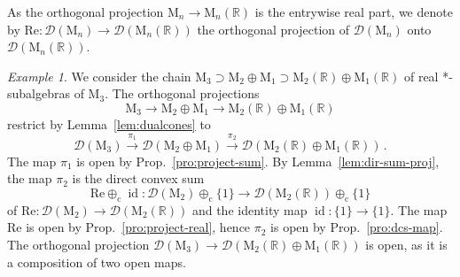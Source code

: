 \documentclass[a4paper,11pt,reqno]{amsart}
\newcommand{\R}{\mathbb{R}}
\newcommand{\M}{\mathrm{M}}
\newcommand{\cD}{\mathcal{D}}
\renewcommand\Re{\mathrm{Re}}
\newcommand{\dcs}{\oplus_\mathrm{c}}
\DeclareMathOperator\idty{id}
\theoremstyle{definition}
\theoremstyle{remark}
\newtheorem{exa}[thm]{Example}
\numberwithin{equation}{section}
\begin{document}
%
As the orthogonal projection $\M_n\to\M_n(\R)$ is the entrywise real part,
we denote by $\Re:\cD(\M_n)\to\cD(\M_n(\R))$ the orthogonal projection 
of $\cD(\M_n)$ onto $\cD(\M_n(\R))$.
\par
%
\begin{exa}\label{ex:sum2real}
We consider the chain $\M_3\supset\M_2\oplus\M_1\supset\M_2(\R)\oplus\M_1(\R)$
of real *-subalgebras of $\M_3$. The orthogonal projections
\[\textstyle
\M_3
\longrightarrow
\M_2\oplus\M_1
\longrightarrow
\M_2(\R)\oplus\M_1(\R)
\]
restrict by Lemma~\ref{lem:dualcones} to 
\[\textstyle
\cD(\M_3)
\stackrel{\pi_1}{\longrightarrow}
\cD(\M_2\oplus\M_1)
\stackrel{\pi_2}{\longrightarrow}
\cD(\M_2(\R)\oplus\M_1(\R))\,.
\]
The map $\pi_1$ is open by Prop.~\ref{pro:project-sum}. By 
Lemma~\ref{lem:dir-sum-proj}, the map $\pi_2$ is the direct convex sum
\[\textstyle
\Re\dcs\idty:
\cD(\M_2)\dcs\{1\}
\to\cD(\M_2(\R))\dcs\{1\}
\]
of $\Re:\cD(\M_2)\to\cD(\M_2(\R))$ and the identity map $\idty:\{1\}\to\{1\}$. 
The map $\Re$ is open by Prop.~\ref{pro:project-real}, hence $\pi_2$ is open 
by Prop.~\ref{pro:dcs-map}. The orthogonal projection 
$\cD(\M_3)\to\cD(\M_2(\R)\oplus\M_1(\R))$ is open, as it is a composition of 
two open maps.
\end{exa}
%
%
\end{document}
